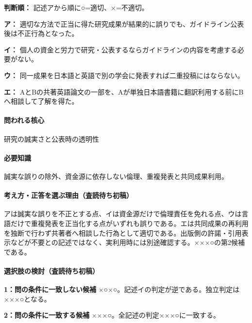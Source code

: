 \noindent\textbf{判断順：} 記述アから順に○=適切、×=不適切。\par

\noindent\textbf{ア：} 適切な方法で正当に得た研究成果が結果的に誤りでも、ガイドライン公表後は不正行為となった。\par

\noindent\textbf{イ：} 個人の資金と労力で研究・公表するならガイドラインの内容を考慮する必要がない。\par

\noindent\textbf{ウ：} 同一成果を日本語と英語で別の学会に発表すれば二重投稿にはならない。\par

\noindent\textbf{エ：} AとBの共著英語論文の一部を、Aが単独日本語書籍に翻訳利用する前にBへ相談して了解を得た。\par

\paragraph{問われる核心} 研究の誠実さと公表時の透明性

\paragraph{必要知識} 誠実な誤りの除外、資金源に依存しない倫理、重複発表と共同成果利用。

\paragraph{考え方・正答を選ぶ理由（査読待ち初稿）} アは誠実な誤りを不正とする点、イは資金源だけで倫理責任を免れる点、ウは言語だけで重複発表を正当化する点がいずれも誤りである。エは共同成果の再利用を独断で行わず共著者へ相談した行為として適切である。出版側の許諾・引用表示などが不要との記述ではなく、実利用時には別途確認する。×××○の第2候補である。

\paragraph{選択肢の検討（査読待ち初稿）}\mbox{}\par

\noindent\textbf{1：問の条件に一致しない候補} ×○×○。記述イの判定が逆である。独立判定は×××○となる。\par

\noindent\textbf{2：問の条件に一致する候補} ×××○。全記述の判定×××○に一致する。\par

